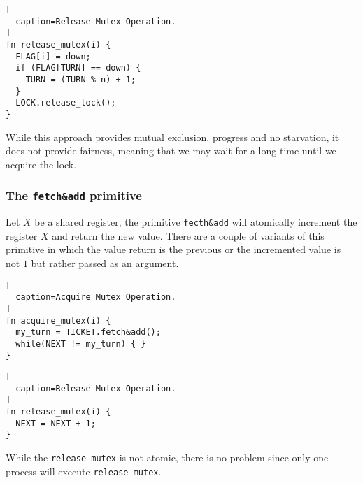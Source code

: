 \begin{lstlisting}[
  caption=Release Mutex Operation.
]
fn release_mutex(i) {
  FLAG[i] = down;
  if (FLAG[TURN] == down) {
    TURN = (TURN % n) + 1;
  }
  LOCK.release_lock();
}
\end{lstlisting}

While this approach provides mutual exclusion, progress and no starvation,
it does not provide fairness, meaning that we may wait for a long time until we acquire the lock.

\subsubsection{The \texttt{fetch\&add} primitive}

Let $X$ be a shared register, the primitive \texttt{fecth\&add} will atomically increment the register $X$ and return the new value.
There are a couple of variants of this primitive in which the value return is the previous or the incremented value is not $1$ but rather passed as an argument.

\begin{lstlisting}[
  caption=Acquire Mutex Operation.
]
fn acquire_mutex(i) {
  my_turn = TICKET.fetch&add();
  while(NEXT != my_turn) { }
}
\end{lstlisting}

\begin{lstlisting}[
  caption=Release Mutex Operation.
]
fn release_mutex(i) {
  NEXT = NEXT + 1;
}
\end{lstlisting}

While the \texttt{release\_mutex} is not atomic,
there is no problem since only one process will execute \texttt{release\_mutex}.
